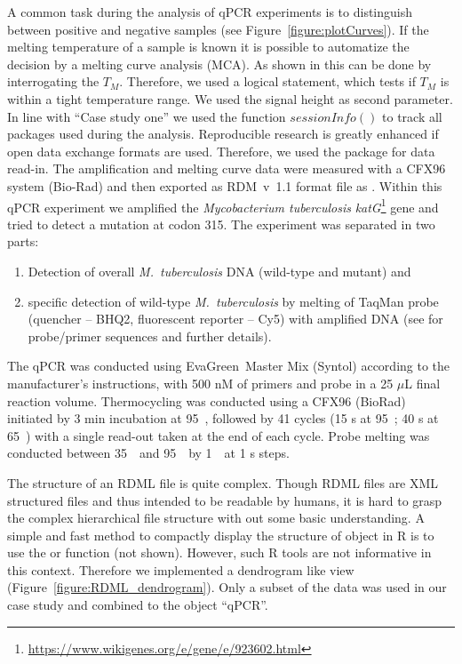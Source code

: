 A common task during the analysis of qPCR experiments is to distinguish between 
positive and negative samples (see Figure~\ref{figure:plotCurves}). If the 
melting temperature of a sample is known it is possible to automatize the 
decision by a melting curve analysis (MCA). As shown in \citet{roediger_RJ_2013} 
this can be done by interrogating the $T_{M}$. Therefore, we used a logical 
statement, which tests if $T_{M}$ is within a tight temperature range. We used 
the signal height as second parameter. In line with ``Case study one'' we used 
the function $sessionInfo()$ to track all packages used during the analysis. 
Reproducible research is greatly enhanced if open data exchange formats are 
used. Therefore, we used the  package for data read-in. The 
amplification and melting curve data were measured with a CFX96 system (Bio-Rad) 
and then exported as RDM~v~1.1 format file as . 
Within this qPCR experiment we amplified the \textit{Mycobacterium tuberculosis} 
\textit{katG}\footnote{\url{https://www.wikigenes.org/e/gene/e/923602.html}} 
gene and tried to detect a mutation at codon 315. The experiment was separated 
in two parts: 
\begin{enumerate}
 \item Detection of overall \textit{M.~tuberculosis} DNA (wild-type 
and mutant) and
 \item specific detection of wild-type \textit{M.~tuberculosis} by melting of 
TaqMan probe (quencher -- BHQ2, fluorescent reporter -- Cy5) with amplified DNA 
(see \citet{luo_multiplex_2011} for probe/primer sequences and further details).
\end{enumerate}

The qPCR was conducted using EvaGreen\circledR~Master Mix (Syntol) according to 
the manufacturer's instructions, with 500 nM of primers and probe in a 25 $\mu$L 
final reaction volume. Thermocycling was conducted using a CFX96 (BioRad) 
initiated by 3 min incubation at 95~\textcelsius, followed by 41 cycles (15 s at 
95~\textcelsius; 40 s at 65~\textcelsius) with a single read-out taken at the 
end of each cycle. Probe melting was conducted between 35~\textcelsius~and 
95~\textcelsius~by 1~\textcelsius~at 1 s steps.

The structure of an RDML file is quite complex. Though RDML files are XML 
structured files and thus intended to be readable by humans, it is hard to grasp 
the complex hierarchical file structure with out some basic understanding. A 
simple and fast method to compactly display the structure of object in R is to 
use the  or  function (not shown). However, such R tools 
are not informative in this context. Therefore we implemented a dendrogram like 
view (Figure~\ref{figure:RDML_dendrogram}). Only a subset of the data was used 
in our case study and combined to the object ``qPCR''.

